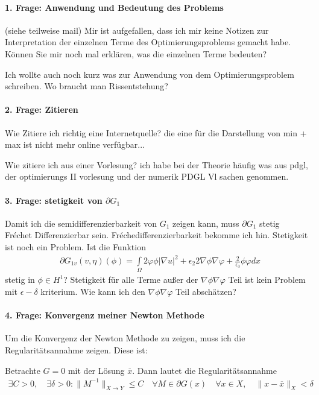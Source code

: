 \documentclass[10pt,a4paper]{article}
\begin{document}
\paragraph{1. Frage: Anwendung und Bedeutung des Problems}
(siehe teilweise mail)
Mir ist aufgefallen, dass ich mir keine Notizen zur Interpretation der einzelnen Terme des Optimierungsproblems gemacht habe. Können Sie mir noch mal erklären, was die einzelnen Terme bedeuten?

Ich wollte auch noch kurz was zur Anwendung von dem Optimierungsproblem schreiben. Wo braucht man Rissentstehung?

\paragraph{2. Frage: Zitieren}
Wie Zitiere ich richtig eine Internetquelle? die eine für die Darstellung von min + max ist nicht mehr online verfügbar...

Wie zitiere ich aus einer Vorlesung? ich habe bei der Theorie häufig was aus pdgl, der optimierungs II vorlesung und der numerik PDGL Vl sachen genommen.

\paragraph{3. Frage: stetigkeit von $ \partial G_1$}
Damit ich die semidifferenzierbarkeit von $G_1$ zeigen kann, muss $\partial G_1$ stetig Fréchet Differenzierbar sein. Fréchedifferenzierbarkeit bekomme ich hin. Stetigkeit ist noch ein Problem. Ist die Funktion
\begin{align*}
	& \partial G_{1 v} (v, \eta)(\phi) = \int\limits_{\Omega} 2 \varphi  \phi | \nabla u|^2 + \epsilon_2 2 \nabla \phi \nabla \varphi  + \frac{2}{\epsilon_3} \phi \varphi dx
\end{align*}
stetig in $\phi \in H^1$? Stetigkeit für alle Terme außer der $\nabla \phi \nabla \varphi $ Teil ist kein Problem mit $\epsilon -\delta$ kriterium. Wie kann ich den  $\nabla \phi \nabla \varphi $ Teil abschätzen? 

\paragraph{4. Frage: Konvergenz meiner Newton Methode}
Um die Konvergenz der Newton Methode zu zeigen, muss ich die Regularitätsannahme zeigen. Diese ist: 

	Betrachte  $G=0$ mit der Lösung $\overline{x}$. Dann lautet die Regularitätsannahme
	\begin{align}
	\label{eq:regularitaetsbedingung}
	\exists C>0, \quad \exists \delta >0 : \|M^{-1}\|_{X \rightarrow Y} \le C \quad \forall M \in \partial G(x) \quad \forall x \in X, \quad \|x-\overline{x}\|_X<\delta
	\end{align}
\end{document}
